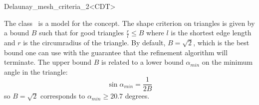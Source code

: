 \begin{ccRefClass}{Delaunay_mesh_criteria_2<CDT>}

\ccDefinition
  
The class \ccRefName\ is a model for the  concept.
The shape criterion on triangles is given by a bound $B$ such that for good
triangles $\frac{r}{l} \le B$ where $l$ is the shortest edge length
and $r$ is the circumradius of the triangle.  By default, $B=\sqrt{2}$,
which is the best bound one can use with the guarantee that the refinement
algorithm will terminate. The upper bound $B$ is related to a lower bound
$\alpha_{min}$ on the minimum angle in the triangle:
\begin{displaymath}
  \sin{ \alpha_{min} } = \frac{1}{2 B}
\end{displaymath}
so $B=\sqrt{2}$ corresponds to  $\alpha_{min} \ge 20.7$ degrees.


\ccIsModel


\ccCreation
{}
\end{ccRefClass}

